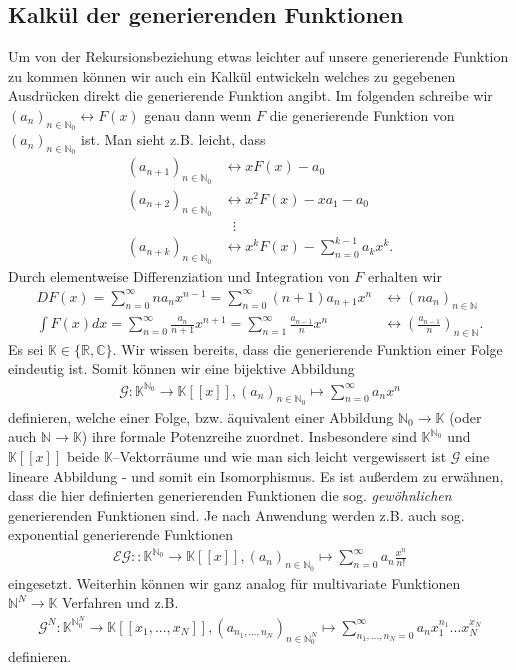 \documentclass[a4paper,11pt]{article}
\theoremstyle{mytheor}
\newcommand{\N}[0]{\mathbb{N}}
\newcommand{\R}[0]{\mathbb{R}}
\newcommand{\C}[0]{\mathbb{C}}
\newcommand{\K}[0]{\mathbb{K}}
\begin{document}
\subsection{Kalkül der generierenden Funktionen}

Um von der Rekursionsbeziehung etwas leichter auf unsere generierende Funktion zu kommen können wir auch ein Kalkül entwickeln welches zu gegebenen Ausdrücken direkt die generierende Funktion angibt. Im folgenden schreibe wir $(a_n)_{n \in \N_0} \longleftrightarrow F(x)$ genau dann wenn $F$ die generierende Funktion von $(a_n)_{n \in \N_0}$ ist.
Man sieht z.B. leicht, dass
\begin{align}
    (a_{n+1})_{n \in \N_0} & \longleftrightarrow xF(x) - a_0                       \label{gfVerschiebungDiskret} \\
    (a_{n+2})_{n \in \N_0} & \longleftrightarrow x^2F(x) - x a_1 - a_0           \nonumber                       \\
                           & ~~~\vdots                                          \nonumber                        \\
    (a_{n+k})_{n \in \N_0} & \longleftrightarrow x^kF(x) - \sum_{n=0}^{k-1} a_k x^k.\nonumber
\end{align}
Durch elementweise Differenziation und Integration von $F$ erhalten wir
\begin{align*}
    DF(x) = \sum_{n=0}^\infty n a_n x^{n-1} = \sum_{n=0}^\infty (n+1) a_{n+1} x^n                      & \longleftrightarrow (n a_n)_{n \in \N}                         \\
    \int F(x) dx = \sum_{n=0}^\infty \frac{a_n}{n+1} x^{n+1} = \sum_{n=1}^\infty \frac{a_{n-1}}{n} x^n & \longleftrightarrow \left(\frac{a_{n-1}}{n}\right)_{n \in \N}.
\end{align*}
Es sei $\K \in \{\R, \C\}$. Wir wissen bereits, dass die generierende Funktion einer Folge eindeutig ist. Somit können wir eine bijektive Abbildung
\begin{align*}
    \mathcal{G} : \K^{\N_0} \to \mathbb{K}[[x]], (a_n)_{n \in \N_0} \mapsto \sum_{n=0}^\infty a_n x^n
\end{align*} definieren, welche einer Folge, bzw. äquivalent einer Abbildung $\N_0 \to \K$ (oder auch $\N \to \K$) ihre formale Potenzreihe zuordnet. Insbesondere sind $\K^{\N_0}$ und $\K[[x]]$ beide $\K$--Vektorräume und wie man sich leicht vergewissert ist $\mathcal{G}$ eine lineare Abbildung - und somit ein Isomorphismus.
Es ist außerdem zu erwähnen, dass die hier definierten generierenden Funktionen die sog. \emph{gewöhnlichen} generierenden Funktionen sind. Je nach Anwendung werden z.B. auch sog. exponential generierende Funktionen
\begin{align*}
    \mathcal{EG} : : \K^{\N_0} \to \mathbb{K}[[x]], (a_n)_{n \in \N_0} \mapsto \sum_{n=0}^\infty a_n \frac{x^n}{n!}
\end{align*}
eingesetzt. Weiterhin können wir ganz analog für multivariate Funktionen $\N^N \to \K$ Verfahren und z.B.
\begin{align*}
    \mathcal{G}^N : \K^{\N_0^N} \to \mathbb{K}[[x_1,...,x_N]], (a_{n_1,...,n_N})_{n \in \N_0^N} \mapsto \sum_{n_1,...,n_N=0}^\infty a_n x_1^{n_1}...x_N^{x_N}
\end{align*}
definieren.
\end{document}
